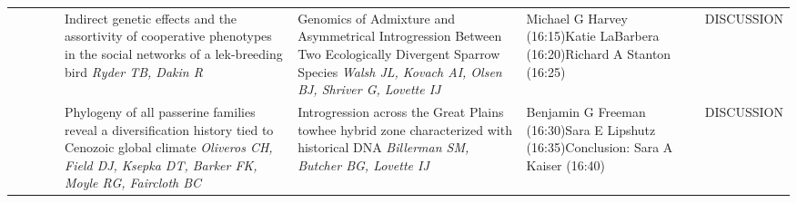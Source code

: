 \begin{tabular}{|x{0.85cm}|x{2.85cm}|x{2.85cm}|x{2.85cm}|x{2.85cm}|a{2.85cm}|a{2.85cm}|a{2.85cm}|}
& \newline \newline \textit{} &  \newline \newline \textit{} &  \newline \newline \textit{} & Indirect genetic effects and the assortivity of cooperative phenotypes in the social networks of a lek-breeding bird \newline \newline \textit{Ryder TB, Dakin R} & Genomics of Admixture and Asymmetrical Introgression Between Two Ecologically Divergent Sparrow Species \newline \newline \textit{Walsh JL, Kovach AI, Olsen BJ, Shriver G, Lovette IJ} & Michael G Harvey (16:15)\newline \newline \newline Katie  LaBarbera (16:20)\newline \newline \newline Richard A Stanton (16:25) \newline \newline \textit{} & DISCUSSION \newline \newline \textit{}\\
& \newline \newline \textit{} &  \newline \newline \textit{} &  \newline \newline \textit{} & Phylogeny of all passerine families reveal a diversification history tied to Cenozoic global climate \newline \newline \textit{Oliveros CH, Field DJ, Ksepka DT, Barker FK, Moyle RG, Faircloth BC} & Introgression across the Great Plains towhee hybrid zone characterized with historical DNA \newline \newline \textit{Billerman SM, Butcher BG, Lovette IJ} & Benjamin G Freeman (16:30)\newline \newline \newline Sara E Lipshutz (16:35)\newline \newline \newline Conclusion: Sara A Kaiser (16:40) \newline \newline \textit{} & DISCUSSION \newline \newline \textit{}\\

\end{tabular}
